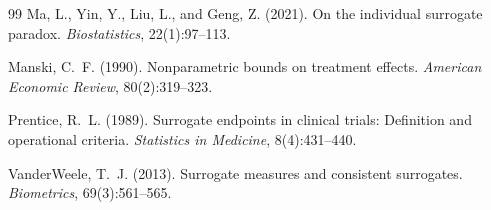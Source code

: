 \documentclass[11pt]{article}
\theoremstyle{definition}
\theoremstyle{plain}
\theoremstyle{remark}
\begin{document}
\begin{thebibliography}{99}
Ma, L., Yin, Y., Liu, L., and Geng, Z. (2021).
\newblock On the individual surrogate paradox.
\newblock \emph{Biostatistics}, 22(1):97--113.

Manski, C.~F. (1990).
\newblock Nonparametric bounds on treatment effects.
\newblock \emph{American Economic Review}, 80(2):319--323.

Prentice, R.~L. (1989).
\newblock Surrogate endpoints in clinical trials: Definition and operational criteria.
\newblock \emph{Statistics in Medicine}, 8(4):431--440.

VanderWeele, T.~J. (2013).
\newblock Surrogate measures and consistent surrogates.
\newblock \emph{Biometrics}, 69(3):561--565.
\end{thebibliography}
\end{document}
